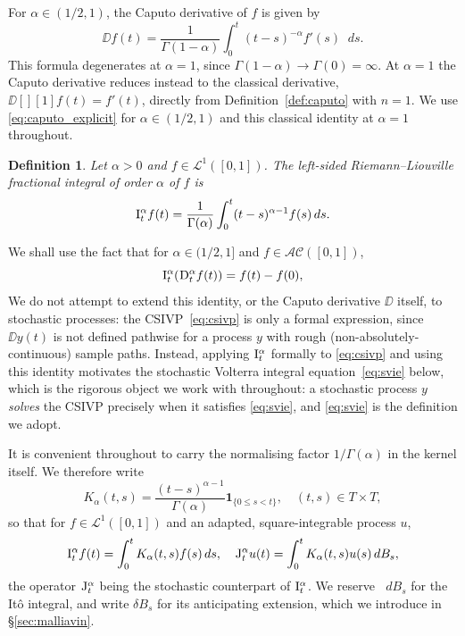 \documentclass[11pt, a4paper]{article}
\theoremstyle{theoremstyle}
\theoremstyle{definitionstyle}
\newtheorem{definition}[theorem]{Definition}
\newcommand{\dd}{\mathop{}\!d}
\begin{document}
For $\alpha \in (1/2, 1)$, the Caputo derivative of $f$ is given by
\begin{equation}\label{eq:caputo_explicit}
    \DD f(t) = \frac{1}{\Gamma(1 - \alpha)}\int_0^t (t - s)^{-\alpha}f'(s)\dd{s}.
\end{equation}
This formula degenerates at $\alpha=1$, since $\Gamma(1-\alpha)\to\Gamma(0)=\infty$. At $\alpha=1$ the Caputo derivative reduces instead to the classical derivative, $\DD[][1] f(t) = f'(t)$, directly from Definition~\ref{def:caputo} with $n=1$. We use \eqref{eq:caputo_explicit} for $\alpha\in(1/2,1)$ and this classical identity at $\alpha=1$ throughout.

\begin{definition}
    Let $\alpha > 0$ and $f \in \mathcal L^1([0, 1])$. The \emph{left-sided Riemann--Liouville fractional integral} of order $\alpha$ of $f$ is
    \begin{equation}
        \II f(t) = \frac 1{\Gamma(\alpha)} \int_0^t (t - s)^{\alpha - 1}f(s)\dd{s}.
    \end{equation}
\end{definition}

We shall use the fact that for $\alpha \in (1/2, 1]$ and $f \in \mathcal{AC}([0, 1])$,
\begin{equation}
    \II (\DD f(t)) = f(t) - f(0),
\end{equation}
We do not attempt to extend this identity, or the Caputo derivative $\DD$ itself, to stochastic processes: the CSIVP~\eqref{eq:csivp} is only a formal expression, since $\DD y(t)$ is not defined pathwise for a process $y$ with rough (non-absolutely-continuous) sample paths. Instead, applying $\II$ formally to \eqref{eq:csivp} and using this identity motivates the stochastic Volterra integral equation~\eqref{eq:svie} below, which is the rigorous object we work with throughout: a stochastic process $y$ \emph{solves} the CSIVP precisely when it satisfies \eqref{eq:svie}, and \eqref{eq:svie} is the definition we adopt.

It is convenient throughout to carry the normalising factor $1/\Gamma(\alpha)$ in the kernel itself. We therefore write
\begin{equation}\label{eq:kernel}
    K_\alpha(t, s) = \frac{(t - s)^{\alpha - 1}}{\Gamma(\alpha)}\mathbf 1_{\{0 \leq s < t\}}, \quad (t, s) \in T \times T,
\end{equation}
so that for $f \in \mathcal L^1([0, 1])$ and an adapted, square-integrable process $u$,
\begin{equation}\label{eq:kernel_operators}
    \II f(t) = \int_0^t K_\alpha(t, s)f(s)\dd{s}, \quad \JJ u(t) = \int_0^t K_\alpha(t, s)u(s)\dd{B_s},
\end{equation}
the operator $\JJ$ being the stochastic counterpart of $\II$. We reserve $\dd{B_s}$ for the It\^o integral, and write $\delta B_s$ for its anticipating extension, which we introduce in \S\ref{sec:malliavin}.
\end{document}

